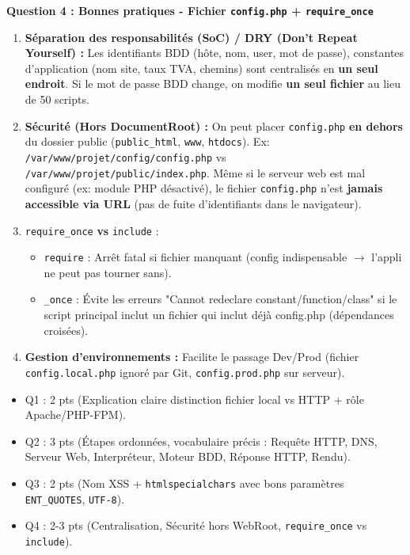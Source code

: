 \documentclass[11pt]{article}
\begin{document}
\begin{corrige}
\textbf{Question 4 : Bonnes pratiques - Fichier \texttt{config.php} + \texttt{require\_once}}

\begin{enumerate}
    \item \textbf{Séparation des responsabilités (SoC) / DRY (Don't Repeat Yourself) :} Les identifiants BDD (hôte, nom, user, mot de passe), constantes d'application (nom site, taux TVA, chemins) sont centralisés en \textbf{un seul endroit}. Si le mot de passe BDD change, on modifie \textbf{un seul fichier} au lieu de 50 scripts.
    \item \textbf{Sécurité (Hors DocumentRoot) :} On peut placer \texttt{config.php} \textbf{en dehors} du dossier public (\texttt{public\_html}, \texttt{www}, \texttt{htdocs}). Ex: \texttt{/var/www/projet/config/config.php} vs \texttt{/var/www/projet/public/index.php}. Même si le serveur web est mal configuré (ex: module PHP désactivé), le fichier \texttt{config.php} n'est \textbf{jamais accessible via URL} (pas de fuite d'identifiants dans le navigateur).
    \item \texttt{require\_once} \textbf{vs} \texttt{include} : 
    \begin{itemize}
        \item \texttt{require} : Arrêt fatal si fichier manquant (config indispensable $\rightarrow$ l'appli ne peut pas tourner sans).
        \item \texttt{\_once} : Évite les erreurs "Cannot redeclare constant/function/class" si le script principal inclut un fichier qui inclut déjà config.php (dépendances croisées).
    \end{itemize}
    \item \textbf{Gestion d'environnements :} Facilite le passage Dev/Prod (fichier \texttt{config.local.php} ignoré par Git, \texttt{config.prod.php} sur serveur).
\end{enumerate}

\begin{aretenir}
\begin{itemize}
    \item Q1 : 2 pts (Explication claire distinction fichier local vs HTTP + rôle Apache/PHP-FPM).
    \item Q2 : 3 pts (Étapes ordonnées, vocabulaire précis : Requête HTTP, DNS, Serveur Web, Interpréteur, Moteur BDD, Réponse HTTP, Rendu).
    \item Q3 : 2 pts (Nom XSS + \texttt{htmlspecialchars} avec bons paramètres \texttt{ENT\_QUOTES}, \texttt{UTF-8}).
    \item Q4 : 2-3 pts (Centralisation, Sécurité hors WebRoot, \texttt{require\_once} vs \texttt{include}).
\end{itemize}
\end{aretenir}
\end{corrige}
\end{document}
